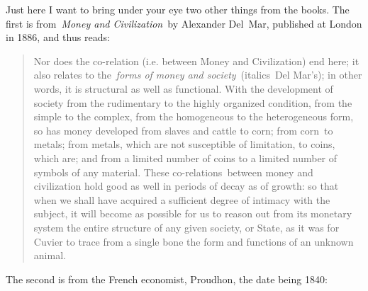 \documentclass[openany,nobib]{tufte-book}
\begin{document}
Just here I want to bring under your eye two other things from the
books. The first is from~\emph{Money and Civilization}~by Alexander
Del~Mar, published at London in 1886, and thus reads:~

\begin{quote}
Nor does the co-relation (i.e. between Money and Civilization) end here;
it also relates to the~\emph{forms of money and society}~(italics~Del
Mar's); in other words, it is structural as well as functional. With the
development of society from the rudimentary to the highly organized
condition, from the simple to the complex, from the homogeneous to the
heterogeneous form, so has money developed from slaves and cattle to
corn; from corn~to metals; from metals, which are not susceptible of
limitation, to coins, which are; and from a limited number of coins to a
limited number of symbols of any material. These co-relations~between
money and civilization hold good as well in periods of decay as of
growth: so that when we shall have acquired a sufficient degree of
intimacy with the subject, it will become as possible for us to reason
out from its monetary system the entire structure of any given society,
or State, as it was for Cuvier to trace from a single bone the form and
functions of an unknown animal.~
\end{quote}

The second is from the French economist, Proudhon, the date being 1840:~
\end{document}
